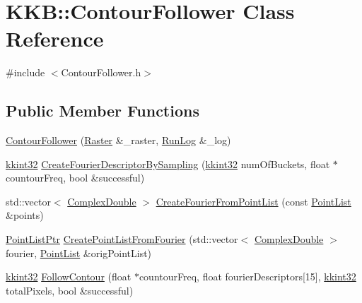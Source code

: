 \hypertarget{class_k_k_b_1_1_contour_follower}{}\section{K\+KB\+:\+:Contour\+Follower Class Reference}
\label{class_k_k_b_1_1_contour_follower}


{\ttfamily \#include $<$Contour\+Follower.\+h$>$}

\subsection*{Public Member Functions}
\begin{DoxyCompactItemize}
\item 
\hyperlink{class_k_k_b_1_1_contour_follower_ad448455edc54f2bcb783cd16495ca9ba}{Contour\+Follower} (\hyperlink{class_k_k_b_1_1_raster}{Raster} \&\+\_\+raster, \hyperlink{class_k_k_b_1_1_run_log}{Run\+Log} \&\+\_\+log)
\item 
\hyperlink{namespace_k_k_b_a8fa4952cc84fda1de4bec1fbdd8d5b1b}{kkint32} \hyperlink{class_k_k_b_1_1_contour_follower_a2ec611c3cee8c1a1ba8482f26130c254}{Create\+Fourier\+Descriptor\+By\+Sampling} (\hyperlink{namespace_k_k_b_a8fa4952cc84fda1de4bec1fbdd8d5b1b}{kkint32} num\+Of\+Buckets, float $\ast$countour\+Freq, bool \&successful)
\item 
std\+::vector$<$ \hyperlink{namespace_k_k_b_a307e28915a31eb2034af6cb1d0d5fb88}{Complex\+Double} $>$ \hyperlink{class_k_k_b_1_1_contour_follower_a2d374e30200b7452cb0fc4eff96e0d51}{Create\+Fourier\+From\+Point\+List} (const \hyperlink{class_k_k_b_1_1_point_list}{Point\+List} \&points)
\item 
\hyperlink{namespace_k_k_b_ad6b8056511ec9a218dd5ef30b57d1415}{Point\+List\+Ptr} \hyperlink{class_k_k_b_1_1_contour_follower_a777f2444405ce218e05097c044488f02}{Create\+Point\+List\+From\+Fourier} (std\+::vector$<$ \hyperlink{namespace_k_k_b_a307e28915a31eb2034af6cb1d0d5fb88}{Complex\+Double} $>$ fourier, \hyperlink{class_k_k_b_1_1_point_list}{Point\+List} \&orig\+Point\+List)
\item 
\hyperlink{namespace_k_k_b_a8fa4952cc84fda1de4bec1fbdd8d5b1b}{kkint32} \hyperlink{class_k_k_b_1_1_contour_follower_aff3d61b95ed022794fd58f8be5032096}{Follow\+Contour} (float $\ast$countour\+Freq, float fourier\+Descriptors\mbox{[}15\mbox{]}, \hyperlink{namespace_k_k_b_a8fa4952cc84fda1de4bec1fbdd8d5b1b}{kkint32} total\+Pixels, bool \&successful)
\item 

\end{DoxyCompactItemize}
